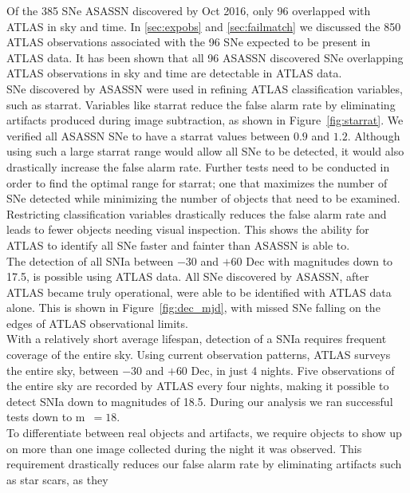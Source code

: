 \documentclass[aps,prb,twocolumn,superscriptaddress]{revtex4-1}
\begin{document}
\indent Of the 385 SNe ASASSN discovered by Oct 2016, only 96 overlapped
with ATLAS in sky and time.  
In \cref{sec:expobs} and \cref{sec:failmatch} we discussed the 850 
ATLAS observations associated with the 96 SNe expected to be 
present in ATLAS data.  
It has been shown that all 96 ASASSN discovered SNe overlapping ATLAS 
observations in sky and time are detectable in ATLAS data.\\
%
\indent SNe discovered by ASASSN were used in refining ATLAS classification 
variables, such as starrat.  Variables like starrat reduce the 
false alarm rate by eliminating artifacts produced during image 
subtraction, as shown in Figure~\ref{fig:starrat}.  We verified all ASASSN 
SNe to have a starrat values between $0.9$ and $1.2$.  
Although using such a large starrat range would allow all SNe to be detected, 
it would also drastically increase the false alarm rate.  Further tests need 
to be conducted in order to find the optimal range for starrat; one that maximizes 
the number of SNe detected while minimizing the number of objects that need to be examined.  
Restricting classification variables drastically reduces the false alarm rate and leads 
to fewer objects needing visual inspection. This shows the ability 
for ATLAS to identify all SNe faster and fainter than ASASSN is able to.\\
%
\indent The detection of all SNIa between $-30$ and $+60$ Dec with 
magnitudes down to 17.5, is possible using ATLAS data.  
All SNe discovered by ASASSN, after ATLAS became truly operational, were 
able to be identified with ATLAS data alone.  This is shown in 
Figure~\ref{fig:dec_mjd}, with missed SNe falling on the edges of ATLAS 
observational limits.\\
%
\indent With a relatively short average lifespan, detection of a SNIa requires 
frequent coverage of the entire sky. Using current observation patterns,
ATLAS surveys the entire sky, between $-30$ and $+60$ Dec, in just 4 nights. 
Five observations of the entire sky are recorded by ATLAS every four nights, 
making it possible to detect SNIa down to magnitudes of 18.5.  During our analysis 
we ran successful tests down to m~$=18$.\\
%
\indent To differentiate between real objects 
and artifacts, we require objects to show up on 
more than one image collected during the night it was observed.  
This requirement drastically reduces our false alarm rate by 
eliminating artifacts such as star scars, as they 
\end{document}
